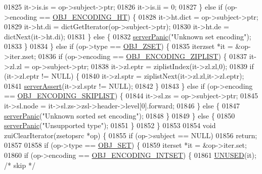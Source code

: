 \begin{DoxyCode}
01825             it->is.is = op->subject->ptr;
01826             it->is.ii = 0;
01827         \} \textcolor{keywordflow}{else} \textcolor{keywordflow}{if} (op->encoding == \hyperlink{server_8h_a9c10219f68afc557d510d108257d238b}{OBJ\_ENCODING\_HT}) \{
01828             it->ht.dict = op->subject->ptr;
01829             it->ht.di = dictGetIterator(op->subject->ptr);
01830             it->ht.de = dictNext(it->ht.di);
01831         \} \textcolor{keywordflow}{else} \{
01832             \hyperlink{server_8h_a11cc378e7778a830b41240578de3b204}{serverPanic}(\textcolor{stringliteral}{"Unknown set encoding"});
01833         \}
01834     \} \textcolor{keywordflow}{else} \textcolor{keywordflow}{if} (op->type == \hyperlink{server_8h_a8c356422ddbc03bd77694880a30a1953}{OBJ\_ZSET}) \{
01835         iterzset *it = &op->iter.zset;
01836         \textcolor{keywordflow}{if} (op->encoding == \hyperlink{server_8h_aabf064ede983103f1fd0df2086e84eee}{OBJ\_ENCODING\_ZIPLIST}) \{
01837             it->zl.zl = op->subject->ptr;
01838             it->zl.eptr = ziplistIndex(it->zl.zl,0);
01839             \textcolor{keywordflow}{if} (it->zl.eptr != NULL) \{
01840                 it->zl.sptr = ziplistNext(it->zl.zl,it->zl.eptr);
01841                 \hyperlink{server_8h_a88114b5169b4c382df6b56506285e56a}{serverAssert}(it->zl.sptr != NULL);
01842             \}
01843         \} \textcolor{keywordflow}{else} \textcolor{keywordflow}{if} (op->encoding == \hyperlink{server_8h_acfb35db5cb30ed113ed23aeb1a224c4c}{OBJ\_ENCODING\_SKIPLIST}) \{
01844             it->sl.zs = op->subject->ptr;
01845             it->sl.node = it->sl.zs->zsl->header->level[0].forward;
01846         \} \textcolor{keywordflow}{else} \{
01847             \hyperlink{server_8h_a11cc378e7778a830b41240578de3b204}{serverPanic}(\textcolor{stringliteral}{"Unknown sorted set encoding"});
01848         \}
01849     \} \textcolor{keywordflow}{else} \{
01850         \hyperlink{server_8h_a11cc378e7778a830b41240578de3b204}{serverPanic}(\textcolor{stringliteral}{"Unsupported type"});
01851     \}
01852 \}
01853 
01854 \textcolor{keywordtype}{void} zuiClearIterator(zsetopsrc *op) \{
01855     \textcolor{keywordflow}{if} (op->subject == NULL)
01856         \textcolor{keywordflow}{return};
01857 
01858     \textcolor{keywordflow}{if} (op->type == \hyperlink{server_8h_a8d179375a4aac33d3fa7aa80c8ccc75f}{OBJ\_SET}) \{
01859         iterset *it = &op->iter.set;
01860         \textcolor{keywordflow}{if} (op->encoding == \hyperlink{server_8h_a214173987de21c3b7661fddd42b05873}{OBJ\_ENCODING\_INTSET}) \{
01861             \hyperlink{server_8h_ae7c9dc8f13568a9c856573751f1ee1ec}{UNUSED}(it); \textcolor{comment}{/* skip */}

\end{DoxyCode}
